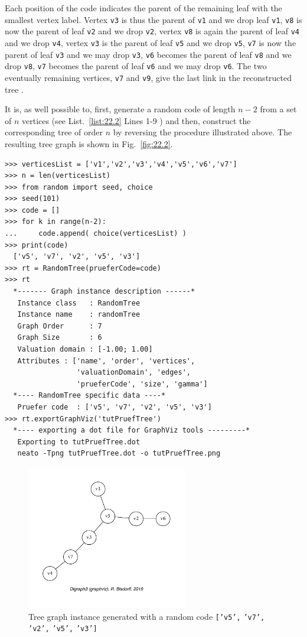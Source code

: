 Each position of the code indicates the parent of the remaining leaf with the smallest vertex label. Vertex \texttt{v3} is thus the parent of \texttt{v1} and we drop leaf \texttt{v1}, \texttt{v8} is now the parent of leaf \texttt{v2} and we drop \texttt{v2}, vertex \texttt{v8} is again the parent of leaf \texttt{v4} and we drop \texttt{v4}, vertex \texttt{v3} is the parent of leaf \texttt{v5} and we drop \texttt{v5}, \texttt{v7} is now the parent of leaf \texttt{v3} and we may drop \texttt{v3}, \texttt{v6} becomes the parent of leaf \texttt{v8} and we drop \texttt{v8}, \texttt{v7} becomes the parent of leaf \texttt{v6} and we may drop \texttt{v6}. The two eventually remaining vertices, \texttt{v7} and \texttt{v9}, give the last link in the reconstructed tree \citep{JPB-1991}.  

It is, as well possible to, first, generate a random \Pruefer code of length $n-2$ from a set of $n$ vertices  (see List.~\vref{list:22.2} Lines 1-9 ) and then, construct the corresponding tree of order $n$ by reversing the procedure illustrated above. The resulting tree graph is shown in Fig.~\vref{fig:22.2}.
\begin{lstlisting}[caption={Generating a tree graph with a random \Pruefer code.},label=list:22.2]
>>> verticesList = ['v1','v2','v3','v4','v5','v6','v7']
>>> n = len(verticesList)
>>> from random import seed, choice
>>> seed(101)
>>> code = []
>>> for k in range(n-2):
...     code.append( choice(verticesList) )
>>> print(code)
  ['v5', 'v7', 'v2', 'v5', 'v3']
>>> rt = RandomTree(prueferCode=code)
>>> rt
  *------- Graph instance description ------*
   Instance class   : RandomTree
   Instance name    : randomTree
   Graph Order      : 7
   Graph Size       : 6
   Valuation domain : [-1.00; 1.00]
   Attributes : ['name', 'order', 'vertices',
                 'valuationDomain', 'edges',
                 'prueferCode', 'size', 'gamma']
  *---- RandomTree specific data ----*
   Pruefer code  : ['v5', 'v7', 'v2', 'v5', 'v3']
>>> rt.exportGraphViz('tutPruefTree')
  *---- exporting a dot file for GraphViz tools ---------*
   Exporting to tutPruefTree.dot
   neato -Tpng tutPruefTree.dot -o tutPruefTree.png
\end{lstlisting}
\begin{figure}[ht]
\sidecaption[t]
\includegraphics[width=7cm]{Figures/22-2-tutPruefTree.pdf}
\caption[Tree graph generated with a random \Pruefer code]{Tree graph instance generated with a random \Pruefer code \texttt{['v5',} \texttt{'v7',} \texttt{'v2',} \texttt{'v5',} \texttt{'v3']}} 
\label{fig:22.2}       %
\end{figure}

